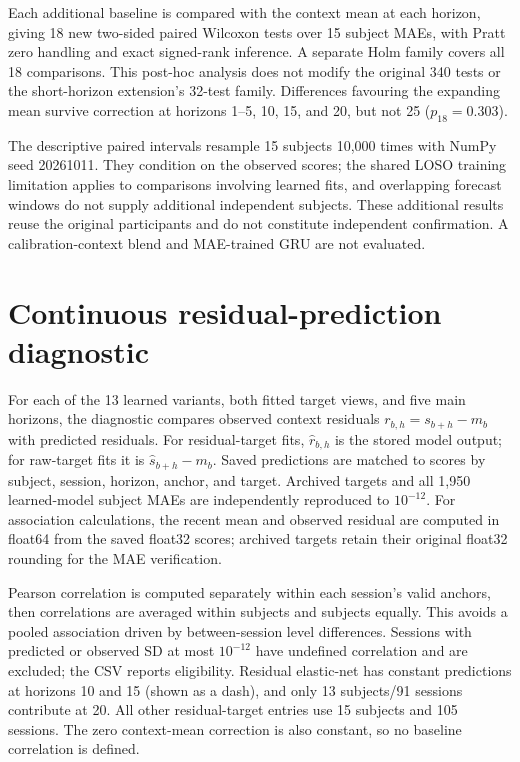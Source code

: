 \documentclass[a4paper,10pt,onecolumn]{IEEEtran}
\begin{document}
\clearpage
Each additional baseline is compared with the context mean at each horizon,
giving 18 new two-sided paired Wilcoxon tests over 15 subject MAEs, with
Pratt zero handling and exact signed-rank inference. A separate Holm family
covers all 18 comparisons. This post-hoc analysis does not modify the original
340 tests or the short-horizon extension's 32-test family. Differences favouring
the expanding mean survive correction at horizons 1--5, 10, 15, and 20,
but not 25 ($p_{18}=0.303$).

The descriptive paired intervals resample 15 subjects 10,000 times with
NumPy seed 20261011. They condition on the observed scores; the shared LOSO
training limitation applies to comparisons involving learned fits, and
overlapping forecast windows do not supply additional independent subjects.
These additional results reuse the original participants and do not constitute
independent confirmation. A calibration-context blend and MAE-trained GRU
are not evaluated.



\clearpage
\section{Continuous residual-prediction diagnostic}\label{sec:supp_residual_diagnostic}

For each of the 13 learned variants, both fitted target views, and five main
horizons, the diagnostic compares observed context residuals
$r_{b,h}=s_{b+h}-m_b$ with predicted residuals. For residual-target fits,
$\hat r_{b,h}$ is the stored model output; for raw-target fits it is
$\hat s_{b+h}-m_b$. Saved predictions are matched to scores by subject,
session, horizon, anchor, and target. Archived targets and all 1,950
learned-model subject MAEs are independently reproduced to $10^{-12}$.
For association calculations, the recent mean and observed residual are
computed in float64 from the saved float32 scores; archived targets retain
their original float32 rounding for the MAE verification.

Pearson correlation is computed separately within each session's valid
anchors, then correlations are averaged within subjects and subjects equally.
This avoids a pooled association driven by between-session level differences.
Sessions with predicted or observed SD at most $10^{-12}$ have undefined
correlation and are excluded; the CSV reports eligibility. Residual elastic-net
has constant predictions at horizons 10 and 15 (shown as a dash), and only
13 subjects/91 sessions contribute at 20. All other residual-target entries
use 15 subjects and 105 sessions. The zero context-mean correction is also
constant, so no baseline correlation is defined.
\end{document}
